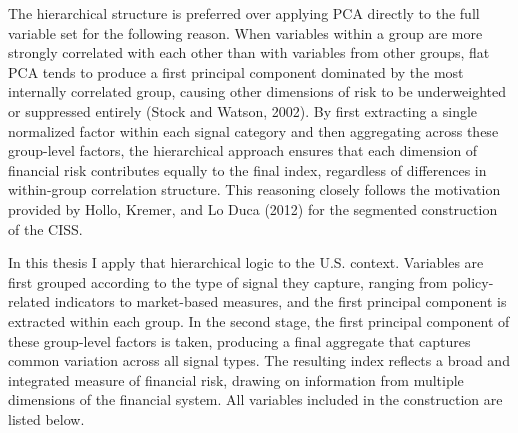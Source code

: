 \documentclass[12pt,a4paper]{report}
\begin{document}
The hierarchical structure is preferred over applying PCA directly to the full variable set for the following reason. When variables within a group are more strongly correlated with each other than with variables from other groups, flat PCA tends to produce a first principal component dominated by the most internally correlated group, causing other dimensions of risk to be underweighted or suppressed entirely (Stock and Watson, 2002). By first extracting a single normalized factor within each signal category and then aggregating across these group-level factors, the hierarchical approach ensures that each dimension of financial risk contributes equally to the final index, regardless of differences in within-group correlation structure. This reasoning closely follows the motivation provided by Hollo, Kremer, and Lo Duca (2012) for the segmented construction of the CISS.

In this thesis I apply that hierarchical logic to the U.S. context. Variables are first grouped according to the type of signal they capture, ranging from policy-related indicators to market-based measures, and the first principal component is extracted within each group. In the second stage, the first principal component of these group-level factors is taken, producing a final aggregate that captures common variation across all signal types. The resulting index reflects a broad and integrated measure of financial risk, drawing on information from multiple dimensions of the financial system. All variables included in the construction are listed below.
\end{document}
